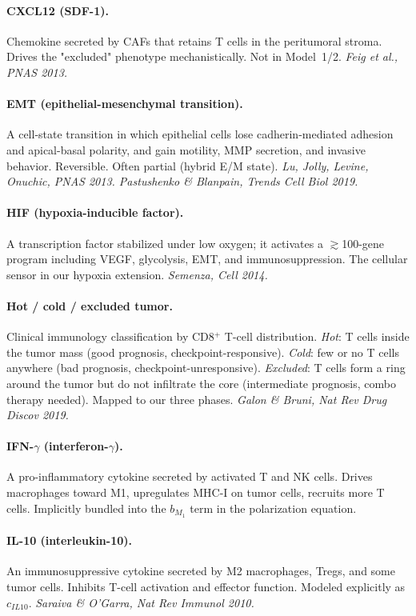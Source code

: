 \documentclass[11pt,letterpaper]{article}
\begin{document}
\paragraph{CXCL12 (SDF-1).}
Chemokine secreted by CAFs that retains T cells in the peritumoral
stroma. Drives the "excluded" phenotype mechanistically. Not in
Model~1/2. \emph{Feig et al., PNAS 2013.}

\paragraph{EMT (epithelial-mesenchymal transition).}
A cell-state transition in which epithelial cells lose cadherin-mediated
adhesion and apical-basal polarity, and gain motility, MMP secretion,
and invasive behavior. Reversible. Often partial (hybrid E/M state).
\emph{Lu, Jolly, Levine, Onuchic, PNAS 2013. Pastushenko \& Blanpain,
Trends Cell Biol 2019.}

\paragraph{HIF (hypoxia-inducible factor).}
A transcription factor stabilized under low oxygen; it activates a
$\gtrsim$100-gene program including VEGF, glycolysis, EMT, and
immunosuppression. The cellular sensor in our hypoxia extension.
\emph{Semenza, Cell 2014.}

\paragraph{Hot / cold / excluded tumor.}
Clinical immunology classification by CD8$^+$ T-cell distribution.
\emph{Hot}: T cells inside the tumor mass (good prognosis,
checkpoint-responsive). \emph{Cold}: few or no T cells anywhere
(bad prognosis, checkpoint-unresponsive). \emph{Excluded}: T cells form
a ring around the tumor but do not infiltrate the core
(intermediate prognosis, combo therapy needed). Mapped to our three
phases. \emph{Galon \& Bruni, Nat Rev Drug Discov 2019.}

\paragraph{IFN-$\gamma$ (interferon-$\gamma$).}
A pro-inflammatory cytokine secreted by activated T and NK cells.
Drives macrophages toward M1, upregulates MHC-I on tumor cells,
recruits more T cells. Implicitly bundled into the $b_{M_1}$ term in
the polarization equation.

\paragraph{IL-10 (interleukin-10).}
An immunosuppressive cytokine secreted by M2 macrophages, Tregs, and
some tumor cells. Inhibits T-cell activation and effector function.
Modeled explicitly as $c_{IL10}$. \emph{Saraiva \& O'Garra, Nat Rev
Immunol 2010.}
\end{document}
